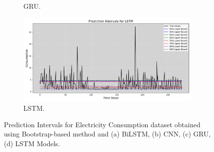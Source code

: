 \begin{figure}[H]
\begin{minipage}{0.6\textwidth}
\begin{subfigure}[b]{1.0\textwidth}
                \caption{GRU.}
            \end{subfigure}
            \begin{subfigure}[b]{1.0\textwidth}
                \centering
                \includegraphics[width=\textwidth]{Chap02/figs/Prediction_Intervals_Styled_LSTM_Electricity_Consumption.png}
                \caption{LSTM.}
            \end{subfigure}
        \end{minipage}
    
    \caption{Prediction Intervals for Electricity Consumption dataset obtained using Bootstrap-based method and (a) BiLSTM, (b) CNN, (c) GRU, (d) LSTM Models.}
    \label{Fi 3.5}
\end{figure}


